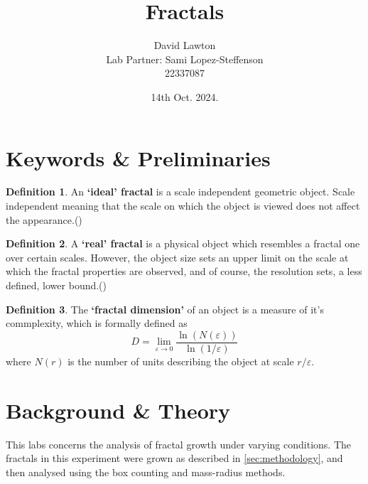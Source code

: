 \documentclass{article}
\title{Fractals}
\author{David Lawton\\
        Lab Partner: Sami Lopez-Steffenson\\
        22337087}
\date{14th Oct. 2024.}
\theoremstyle{definition}
\newtheorem{definition}{Definition}[section]
\theoremstyle{remark}
\begin{document}
\maketitle

\tableofcontents
{}
\begin{abstract}
        
\end{abstract}

\section{Keywords \& Preliminaries}\label{sec:keywords}
\begin{definition}
        An \textbf{`ideal' fractal} is a scale independent geometric object. Scale independent meaning that the scale on which the object is viewed does not affect the appearance.(\cite{LabHandbook})
\end{definition}
\begin{definition}
        A \textbf{`real' fractal} is a physical object which resembles a fractal one over certain scales. However, the object size sets an upper limit on the scale at which the fractal properties are observed, and of course, the resolution sets, a less defined, lower bound.(\cite{LabHandbook})
\end{definition}
\begin{definition}
        The \textbf{`fractal dimension'} of an object is a measure of it's commplexity, which is formally defined as
\begin{equation}
        \label{eq:fractal_dimension}
        D = \lim_{\varepsilon \to 0} \frac{\ln(N(\varepsilon))}{\ln(1/\varepsilon)}
\end{equation}
        where $N(r)$ is the number of units describing the object at scale $r/\varepsilon$.
\end{definition}
\section{Background \& Theory}\label{sec:background}
This labs concerns the analysis of fractal growth under varying conditions. The fractals in this experiment were grown as described in \ref{sec:methodology}, and then analysed using the box counting and mass-radius methods.\\
\end{document}
